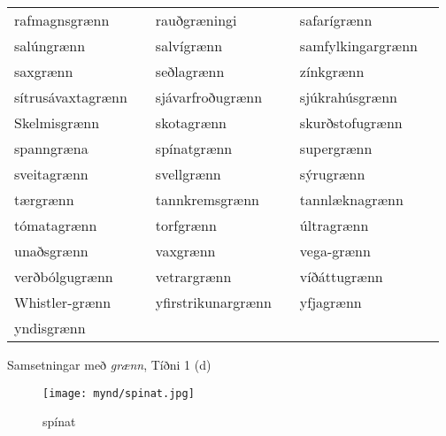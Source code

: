 \documentclass[../samsetningasafn.tex]{subfiles}
\begin{document}
\begin{wordlist}[H]
\begin{tcolorbox}

	\setlength{\extrarowheight}{3pt}
	\begin{tabular}{BlBlBl}		
		rafmagnsgrænn & 	& 
		rauðgræningi	&	& 
		safarígrænn	&		\\  %
		salúngrænn	&		& 
		salvígrænn	&		& 
		samfylkingargrænn &	\\  %
		saxgrænn	&		& 
		seðlagrænn	&		& 
		zínkgrænn	&		\\  %
		sítrusávaxtagrænn &	& 
		sjávarfroðugrænn	&	& 
		sjúkrahúsgrænn	&	\\  %
		Skelmisgrænn	&	& 
		skotagrænn	&		& 
		skurðstofugrænn	&	\\  %
		spanngræna	&		& 
		spínatgrænn	&		& 
		supergrænn	&		\\  %
		sveitagrænn	&		& 
		svellgrænn	&		& 
		sýrugrænn	&		\\  %
		tærgrænn	&		& 
		tannkremsgrænn &	& 
		tannlæknagrænn &	\\  %
		tómatagrænn	&	& 
		torfgrænn	&		& 
		últragrænn	&		\\  %
		unaðsgrænn	&		& 
		vaxgrænn	&		& 
		vega-grænn	&		\\  %
		verðbólgugrænn &	& 
		vetrargrænn	&		& 
		víðáttugrænn	&		\\  %
		Whistler-grænn	&	& 
		yfirstrikunargrænn &	& 
		yfjagrænn	&		\\  %
		yndisgrænn	&		& 
					&		&
					&
	\end{tabular}
	
\end{tcolorbox}
	\caption{Samsetningar með \textit{grænn}, Tíðni 1 (d)}
	\label{listi:graent.1b}
\end{wordlist}	

\begin{figure}[H]
\begin{tcolorbox}
\centering
	\texttt{[image: mynd/spinat.jpg]}
\end{tcolorbox}
	\caption{spínat}
	\label{mynd:spinat}
\end{figure}
\end{document}
